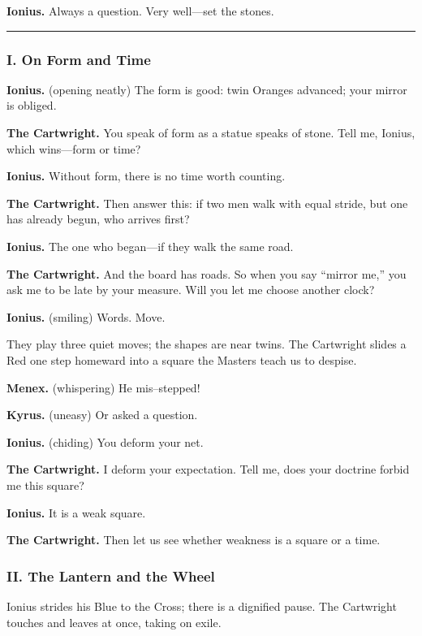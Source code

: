 \documentclass[11pt]{article}
\begin{document}
\noindent\textbf{Ionius.} Always a question. Very well—set the stones.

\medskip
\hrule
\medskip

\subsubsection*{I. On Form and Time}
\noindent\textbf{Ionius.} (opening neatly) The form is good: twin Oranges advanced; your mirror is obliged.

\noindent\textbf{The Cartwright.} You speak of form as a statue speaks of stone. Tell me, Ionius, which wins—form or time?

\noindent\textbf{Ionius.} Without form, there is no time worth counting.

\noindent\textbf{The Cartwright.} Then answer this: if two men walk with equal stride, but one has already begun, who arrives first?

\noindent\textbf{Ionius.} The one who began—if they walk the same road.

\noindent\textbf{The Cartwright.} And the board has roads. So when you say “mirror me,” you ask me to be late by your measure. Will you let me choose another clock?

\noindent\textbf{Ionius.} (smiling) Words. Move.

\medskip
They play three quiet moves; the shapes are near twins. The Cartwright slides a Red one step homeward into a square the Masters teach us to despise.

\noindent\textbf{Menex.} (whispering) He mis–stepped!

\noindent\textbf{Kyrus.} (uneasy) Or asked a question.

\noindent\textbf{Ionius.} (chiding) You deform your net.

\noindent\textbf{The Cartwright.} I deform your expectation. Tell me, does your doctrine forbid me this square?

\noindent\textbf{Ionius.} It is a weak square.

\noindent\textbf{The Cartwright.} Then let us see whether weakness is a square or a time.

\medskip
\subsubsection*{II. The Lantern and the Wheel}
Ionius strides his Blue to the Cross; there is a dignified pause. The Cartwright touches and leaves at once, taking on exile.
\end{document}
